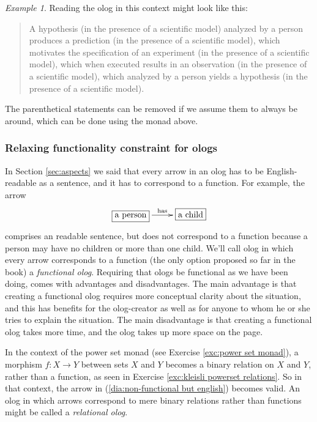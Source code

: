 \documentclass{book}
\def\tn{\textnormal}
\def\to{\rightarrow}
\def\taking{\colon}
\newcommand{\LA}[2]{\ar[#1]^-{\tn {#2}}}
\theoremstyle{remark}
\newtheorem{example}[subsubsection]{Example}
\theoremstyle{definition}
\begin{document}
\begin{example}
Reading the olog in this context might look like this:

\begin{quote}
A hypothesis (in the presence of a scientific model) analyzed by a person produces a prediction (in the presence of a scientific model), which motivates the specification of an experiment (in the presence of a scientific model), which when executed results in an observation (in the presence of a scientific model), which analyzed by a person yields a hypothesis (in the presence of a scientific model).
\end{quote}

The parenthetical statements can be removed if we assume them to always be around, which can be done using the monad above.

\end{example}


\subsubsection{Relaxing functionality constraint for ologs}\label{sec:relaxing ologs}

In Section \ref{sec:aspects} we said that every arrow in an olog has to be English-readable as a sentence, and it has to correspond to a function. For example, the arrow 
\begin{align}\label{dia:non-functional but english}
\xymatrix{\fbox{a person}\LA{r}{has}&\fbox{a child}}
\end{align}
comprises an readable sentence, but does not correspond to a function because a person may have no children or more than one child. 
We'll call olog in which every arrow corresponds to a function (the only option proposed so far in the book) a {\em functional olog}. Requiring that ologs be functional as we have been doing, comes with advantages and disadvantages. The main advantage is that creating a functional olog requires more conceptual clarity about the situation, and this has benefits for the olog-creator as well as for anyone to whom he or she tries to explain the situation. The main disadvantage is that creating a functional olog takes more time, and the olog takes up more space on the page.

In the context of the power set monad (see Exercise \ref{exc:power set monad}), a morphism $f\taking X\to Y$ between sets $X$ and $Y$ becomes a binary relation on $X$ and $Y$, rather than a function, as seen in Exercise \ref{exc:kleisli powerset relations}. So in that context, the arrow in (\ref{dia:non-functional but english}) becomes valid. An olog in which arrows correspond to mere binary relations rather than functions might be called a {\em relational olog}.
\end{document}
